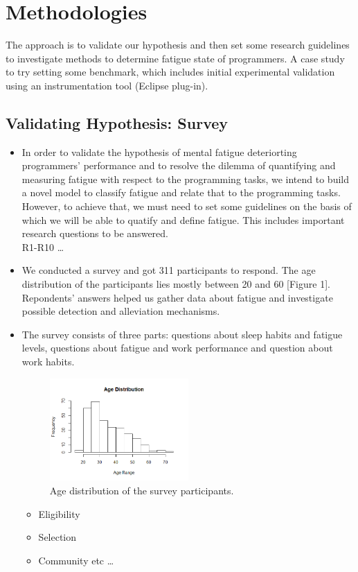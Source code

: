 \documentclass{acm_proc_article-sp}
\begin{document}
\section{Methodologies}
The approach is to validate our hypothesis and then set some research
guidelines to investigate methods to determine fatigue state of programmers. A
case study to try setting some benchmark, which includes initial
experimental validation using an instrumentation tool (Eclipse plug-in). 

\subsection{Validating Hypothesis: Survey}
\begin{itemize}
  \item In order to validate the hypothesis of mental fatigue
  deteriorting programmers' performance and to resolve the dilemma of
  quantifying and measuring fatigue with respect to the programming tasks, we
  intend to build a novel model to classify fatigue and relate that to the
  programming tasks. However, to achieve that, we must need to set some
  guidelines on the basis of which we will be able to quatify and define
  fatigue. This includes important research questions to be answered. \\
  R1-R10 \ldots
  \item We conducted a survey and got 311 participants to respond. The age
  distribution of the participants lies mostly between 20 and 60 [Figure 1].
  Repondents' answers helped us gather data about fatigue and investigate
  possible detection and alleviation mechanisms.
  \item The survey consists of three parts: questions about sleep habits and
  fatigue levels, questions about fatigue and work performance and question
  about work habits.
  \begin{figure}
	\centering
	\includegraphics[width=0.5\textwidth,natwidth=517,natheight=382]{age.png}
	\caption{Age distribution of the survey participants.}
  \end{figure}
  \begin{itemize}
  	\item Eligibility
  	\item Selection
  	\item Community etc \ldots
  \end{itemize}
\end{itemize}
\end{document}

